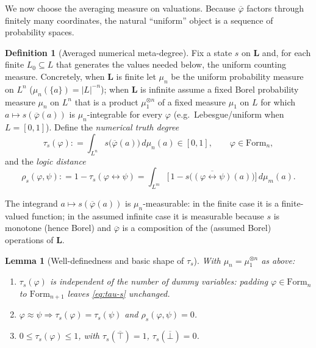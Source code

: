 \documentclass{amsart}
\theoremstyle{definition}
\newtheorem{definition}{Definition}
\theoremstyle{plain}
\newtheorem{lemma}{Lemma}
\newcommand{\eqdef}{\mathrel{\mathop:}=}
\newcommand{\bL}{\mathbf{L}}
\newcommand{\Form}{\mathrm{Form}}
\newcommand{\fbi}{\leftrightarrow}
\newcommand{\Top}{\top}
\newcommand{\Bot}{\bot}
\begin{document}
We now choose the averaging measure on valuations.  Because $\overline\varphi$
factors through finitely many coordinates, the natural ``uniform'' object is a
sequence of probability spaces.

\begin{definition}[Averaged numerical meta-degree]\label{def:tau-state}
Fix a state $s$ on $\bL$ and, for each finite $L_0\subseteq L$ that generates
the values needed below, the uniform counting measure.  Concretely, when $\bL$ is
finite let $\mu_n$ be the uniform probability measure on $L^n$
($\mu_n(\{a\})=|L|^{-n}$); when $\bL$ is infinite assume a fixed Borel probability
measure $\mu_n$ on $L^n$ that is a product $\mu_1^{\otimes n}$ of a fixed measure
$\mu_1$ on $L$ for which $a\mapsto s(\overline\varphi(a))$ is $\mu_n$-integrable
for every $\varphi$ (e.g.\ Lebesgue/uniform when $L=[0,1]$).  Define the
\emph{numerical truth degree}
\begin{equation}\label{eq:tau-s}
\tau_s(\varphi)\eqdef \int_{L^n} s\bigl(\overline\varphi(a)\bigr)\,d\mu_n(a)\in[0,1],
\qquad \varphi\in\Form_n,
\end{equation}
and the \emph{logic distance}
\begin{equation}\label{eq:rho-s}
\rho_s(\varphi,\psi)\eqdef 1-\tau_s(\varphi\fbi\psi)
=\int_{L^m}\bigl[\,1-s\bigl(\overline{(\varphi\fbi\psi)}(a)\bigr)\bigr]\,d\mu_m(a).
\end{equation}
\end{definition}

The integrand $a\mapsto s(\overline\varphi(a))$ is $\mu_n$-measurable: in the
finite case it is a finite-valued function; in the assumed infinite case it is
measurable because $s$ is monotone (hence Borel) and $\overline\varphi$ is a
composition of the (assumed Borel) operations of $\bL$.

\begin{lemma}[Well-definedness and basic shape of $\tau_s$]\label{lem:tau-wd}
With $\mu_n=\mu_1^{\otimes n}$ as above:
\begin{enumerate}
\item\label{it:tau-dummy} $\tau_s(\varphi)$ is independent of the number of dummy
variables: padding $\varphi\in\Form_n$ to $\Form_{n+1}$ leaves
\eqref{eq:tau-s} unchanged.
\item\label{it:tau-eqv} $\varphi\approx\psi\Rightarrow\tau_s(\varphi)=\tau_s(\psi)$
and $\rho_s(\varphi,\psi)=0$.
\item\label{it:tau-range} $0\le\tau_s(\varphi)\le1$, with
$\tau_s(\overline\Top)=1$, $\tau_s(\overline\Bot)=0$.
\end{enumerate}
\end{lemma}
\end{document}
